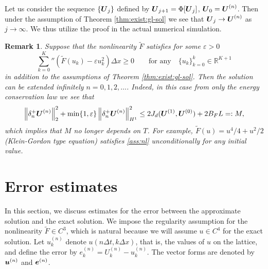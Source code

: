 \documentclass[dvipdfmx-if-dvi,autodetect-engine,ja=standard]{amsart}
\numberwithin{equation}{section} %
\def\vect#1{\mbox{\boldmath $#1$}} %
\newtheorem{remark}{Remark}[section]
\begin{document}
Let us consider the sequence $\{ \vect{U}_j \}$ defined by 
$\vect{U}_{j+1} =\Phi[\vect{U}_j]$, $\vect{U}_0 = \vect{U}^{(n)}$. 
Then under the assumption of Theorem \ref{thm:exist:gl-sol} we see that $\vect{U}_j \to \vect{U}^{(n)}$ as $j \to \infty$. 
We thus utilize the proof in the actual numerical simulation. 



\begin{remark}\label{rem:exist:sol}
Suppose that the nonlinearity $\tilde{F}$
satisfies for some $\varepsilon>0$ 
\begin{equation}\label{ass:nl}
\sum_{k=0}^K{}'' (\tilde{F}(u_k) - \varepsilon u_k^2) \Delta x \geq  0
\qquad \text{for any} \quad \{ u_k \}_{k=0}^k \in \mathbb{R}^{K+1}
\end{equation}
in addition to the assumptions of Theorem \ref{thm:exist:gl-sol}. 
Then 
the solution can be extended infinitely $n=0,1,2,\ldots$. 
Indeed, in this case from only the energy conservation law we see that 
\[
 \left\| \delta_n^+ \vect{U}^{(n)} \right\|_2^2 
+ \min\{ 1, \varepsilon \} \left\| \delta_n^+ \vect{U}^{(n)} \right\|_{H^1}^2
\leq 2 J_d(\vect{U}^{(1)}, \vect{U}^{(0)}) + 2B_F L =:M, 
\]
which implies that $M$ no longer depends on $T$. 
For example, $\tilde{F}(u) = u^4/4 + u^2/2$ (Klein-Gordon type equation) satisfies \eqref{ass:nl} unconditionally for any initial value. 
\end{remark}











\section{Error estimates}
In this section, we discuss
estimates for the error between
the approximate solution and the exact solution. 
We impose the regularity assumption for the nonlinearity
$\widetilde{F} \in C^3$,
which is natural because we will assume
$u \in C^4$
for the exact solution. 
Let $u_k^{(n)}$ denote 
$u(n\Delta t, k \Delta x)$,
that is, the values of $u$ on the lattice,
and define the error by
$e_k^{(n)} = U_k^{(n)} - u_k^{(n)}$.
The vector forms are denoted by
$\vect{u}^{(n)}$ and $\vect{e}^{(n)}$.
\end{document}
